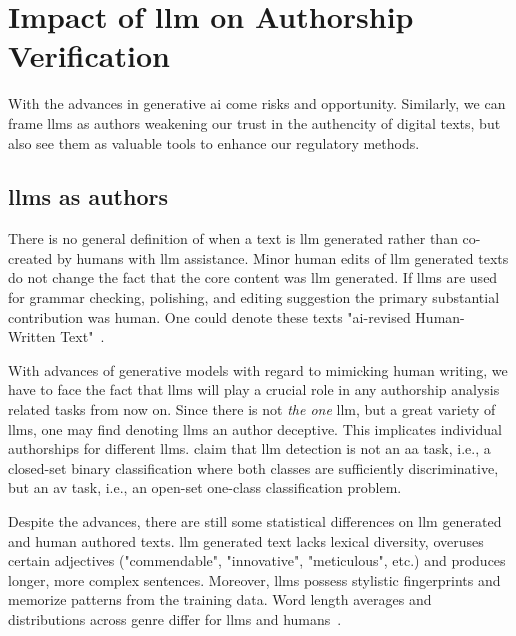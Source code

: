 \section{Impact of \acs{llm} on Authorship Verification}

With the advances in generative \ac{ai} come risks and opportunity.
Similarly, we can frame \acp{llm} as authors weakening our trust in the authencity of digital texts, but also see them as valuable tools to enhance our regulatory methods.

\subsection{\acsp{llm} as authors}
There is no general definition of when a text is \ac{llm} generated rather than co-created by humans with \ac{llm} assistance.
Minor human edits of \ac{llm} generated texts do not change the fact that the core content was \ac{llm} generated.
If \acp{llm} are used for grammar checking, polishing, and editing suggestion the primary substantial contribution was human.
One could denote these texts "\ac{ai}-revised Human-Written Text"~\citep{wang_stumbling_2024}.

With advances of generative models with regard to mimicking human writing, we have to face the fact that \acp{llm} will play a crucial role in any authorship analysis related tasks from now on.
Since there is not \textit{the one} \ac{llm}, but a great variety of \acp{llm}, one may find denoting \acp{llm} an author deceptive.
This implicates individual authorships for different \acp{llm}.
\citet{llm_detection_av_2025} claim that \ac{llm} detection is not an \ac{aa} task, i.e., a closed-set binary classification where both classes are sufficiently discriminative, but an \ac{av} task, i.e., an open-set one-class classification problem. 

Despite the advances, there are still some statistical differences on \ac{llm} generated and human authored texts.
\ac{llm} generated text lacks lexical diversity, overuses certain adjectives ("commendable", "innovative", "meticulous", etc.) and produces longer, more complex sentences.
Moreover, \acp{llm} possess stylistic fingerprints and memorize patterns from the training data.
Word length averages and distributions across genre differ for \acp{llm} and humans~\citep{llm_detection_av_2025}.

